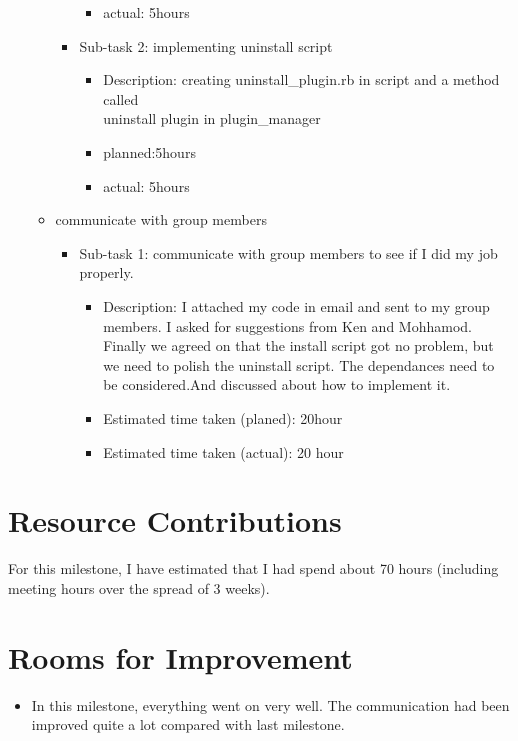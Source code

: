 \begin{itemize}
\begin{itemize}
\begin{itemize}
\begin{itemize}
                            \item actual: 5hours
                        \end{itemize}
                    \item Sub-task 2: implementing uninstall script\\
                        \begin{itemize}
                            \item Description: creating uninstall\_plugin.rb in script and a method called\\ 
                            uninstall plugin in plugin\_manager\\
                            \item planned:5hours
                            \item actual: 5hours
                        \end{itemize}
                \end{itemize}
            \item communicate with group members 
                \begin{itemize}
                    \item Sub-task 1: communicate with group members to see if I did my job properly.
                        \begin{itemize}
                            \item Description: I attached my code in email and sent to my group members. I asked for suggestions from Ken and Mohhamod. Finally we agreed on that the install script got no problem, but we need to polish the uninstall script. The dependances need to be considered.And discussed about how to implement it.
                            \item Estimated time taken (planed): 20hour
                            \item Estimated time taken (actual): 20 hour
                        \end{itemize}
                \end{itemize}
        \end{itemize}
\end{itemize}

\section*{Resource Contributions}

For this milestone, I have estimated that I had spend about 70 hours (including  meeting hours over the spread of 3 weeks).

\section*{Rooms for Improvement}

\begin{itemize}
   \item In this milestone, everything went on very well. The communication had been improved quite a lot compared with last milestone.
\end{itemize}
